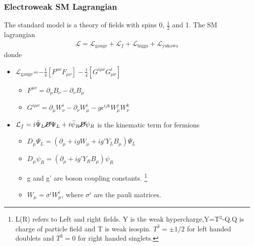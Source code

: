 \documentclass[11pt]{beamer}
\begin{document}
\begin{frame}
\frametitle{Electroweak SM Lagrangian}
The standard model is a theory of fields with spins 0, $\frac{1}{2}$ and 1. 
The  SM lagrangian 	
\begin{align*}
\mathcal{L}=\mathcal{L}_\text{gauge}+\mathcal{L}_f +\mathcal{L}_\text{higgs} + \mathcal{L}_\text{yukawa}
\end{align*}
donde 
\begin{itemize}
	\item $\mathcal{L}_\text{gauge}$=$ -\frac{1}{4}\left[F^{\mu\nu}F_{\mu\nu}\right]-\frac{1}{4}\left[G^{i\mu\nu}G^i_{\mu\nu}\right]$ 
	\begin{itemize}
		\item  $F^{\mu \nu}=\partial_\mu B_\nu -\partial_\nu B_\mu $
		\item  $G^{i\mu\nu}=\partial_\mu W^i_\nu -\partial_\nu W^i_\mu -g\epsilon^{ijk}W^j_\mu W^k_\nu $
	\end{itemize}
	\item $\mathcal{L}_f=i\bar{\Psi}_L \cancel{D}{\Psi}_L+i\bar{\psi}_R \cancel{D}{\psi}_R  $ is the kinematic term for fermions 
\scriptsize{
	\begin{itemize}
		\item $D_\mu {\Psi}_L=\left(\partial_\mu+igW_\mu+ig'Y_LB_\mu\right)\Psi_L$
		\item $D_\mu \psi_R=\left(\partial_\mu +ig' Y_RB_\mu\right)\psi_R $
		\item g and g' are boson coupling constants.
\footnote{\tiny{L(R) refers to Left and right fields.
Y is the  weak hypercharge,Y=T$^3$-Q.Q is charge of particle field and T is weak isospin. $T^3=\pm 1/2$ for left handed doublets and $T^3=0$ for right handed singlets.} }
\item $W_\mu=\sigma^iW^i_\mu$, where $\sigma^i$ are the pauli matrices.
	\end{itemize}
}
\end{itemize}
\end{frame}
\end{document}
